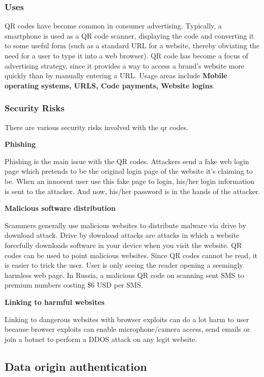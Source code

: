 \documentclass[12pt,journal,compsoc]{IEEEtran}
\begin{document}
\subsubsection{Uses}

QR codes have become common in consumer advertising. Typically, a smartphone is used as a QR code scanner, displaying the code and converting it to some useful form (such as a standard URL for a website, thereby obviating the need for a user to type it into a web browser). QR code has become a focus of advertising strategy, since it provides a way to access a brand's website more quickly than by manually entering a URL. Usage areas include \textbf{Mobile operating systems, URLS, Code payments, Website logins}.

\subsubsection{Security Risks}

There are various security risks involved with the qr codes.

\textbf{Phishing}


Phishing is the main issue with the QR codes. Attackers send a fake web login page which pretends to be the original login page of the website it’s claiming to be. When an innocent user use this fake page to login, his/her login information is sent to the attacker. And now, his/her password is in the hands of the attacker.



\textbf{Malicious software distribution}

Scammers generally use malicious websites to distribute malware via drive by download attack. Drive by download attacks are attacks in which a website forcefully downloads software in your device when you visit the website. QR codes can be used to point malicious websites. Since QR codes cannot be read, it is easier to trick the user. User is only seeing the reader opening a seemingly harmless web page. In Russia, a malicious QR code on scanning sent SMS to premium numbers costing \$6 USD per SMS.

\textbf{Linking to harmful websites}

Linking to dangerous websites with browser exploits can do a lot harm to user because browser exploits can enable microphone/camera access, send emails or join a botnet to perform a DDOS attack on any legit website.

\subsection{Data origin authentication}
\end{document}
